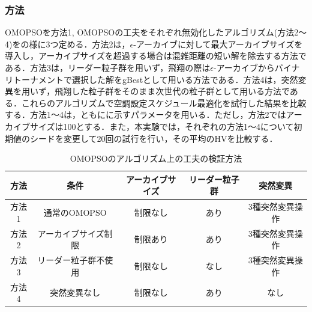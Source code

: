 \subsubsection{方法}
OMOPSOを方法1, OMOPSOの工夫をそれぞれ無効化したアルゴリズム(方法2～4)をの様に3つ定める．方法2は，$\epsilon$-アーカイブに対して最大アーカイブサイズを導入し，アーカイブサイズを超過する場合は混雑距離の短い解を除去する方法である．方法3は，リーダー粒子群を用いず，飛翔の際は$\epsilon$-アーカイブからバイナリトーナメントで選択した解をgBestとして用いる方法である．方法4は，突然変異を用いず，飛翔した粒子群をそのまま次世代の粒子群として用いる方法である．これらのアルゴリズムで空調設定スケジュール最適化を試行した結果を比較する．方法1～4は，ともにに示すパラメータを用いる．ただし，方法2ではアーカイブサイズは100とする．また，本実験では，それぞれの方法1～4について初期値のシードを変更して20回の試行を行い，その平均のHVを比較する．

\begin{table}[ht]
  {\small
    \begin{center}
      \caption{OMOPSOのアルゴリズム上の工夫の検証方法}
      \label{tab::sim_cond_omopso_algo}
      \begin{tabular}{c|c|c|c|c}
        \hline
        方法  & 条件                 & アーカイブサイズ & リーダー粒子群 & 突然変異        \\
        \hline \hline
        方法1 & 通常のOMOPSO         & 制限なし         & あり           & 3種突然変異操作 \\
        方法2 & アーカイブサイズ制限 & 制限あり         & あり           & 3種突然変異操作 \\
        方法3 & リーダー粒子群不使用 & 制限なし         & なし           & 3種突然変異操作 \\
        方法4 & 突然変異なし         & 制限なし         & あり           & なし            \\
        \hline
      \end{tabular}
    \end{center}
  }
\end{table}

